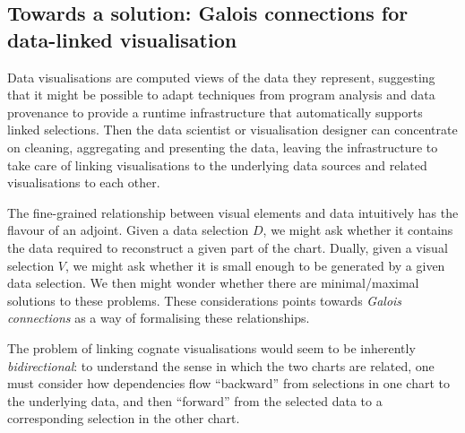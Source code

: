 

\subsection{Towards a solution: Galois connections for data-linked visualisation}

Data visualisations are computed views of the data they represent, suggesting that it might be possible to adapt techniques from program analysis and data provenance to provide a runtime infrastructure that automatically supports linked selections. Then the data scientist or visualisation designer can concentrate on cleaning, aggregating and presenting the data, leaving the infrastructure to take care of linking visualisations to the underlying data sources and related visualisations to each other.

The fine-grained relationship between visual elements and data intuitively has the flavour of an adjoint. Given a data selection $D$, we might ask whether it contains the data required to reconstruct a given part of the chart. Dually, given a visual selection $V$, we might ask whether it is small enough to be generated by a given data selection. We then might wonder whether there are minimal/maximal solutions to these problems. These considerations points towards \emph{Galois connections} as a way of formalising these relationships.

The problem of linking cognate visualisations would seem to be inherently \emph{bidirectional}: to understand the sense in which the two charts are related, one must consider how dependencies flow ``backward'' from selections in one chart to the underlying data, and then ``forward'' from the selected data to a corresponding selection in the other chart.



